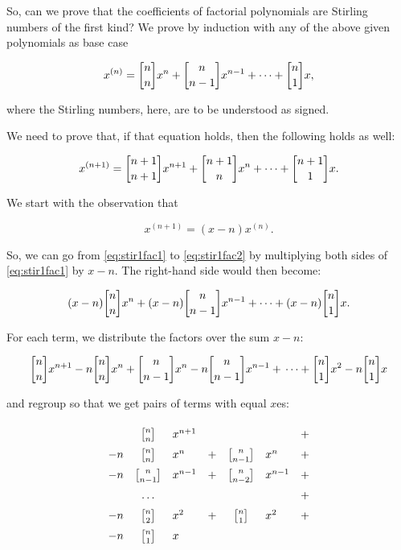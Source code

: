 \documentclass[tikz]{scrreprt}
\begin{document}
So, can we prove that the coefficients of factorial polynomials
are Stirling numbers of the first kind?
We prove by induction with any of the above given polynomials
as base case

\begin{equation}\label{eq:stir1fac1}
x^{(n)} = \stirlingOne{n}{n}x^n + 
          \stirlingOne{n}{n-1}x^{n-1} + \dots + 
          \stirlingOne{n}{1}x,
\end{equation}

where the Stirling numbers, here, are to be understood as signed.

We need to prove that, if that equation holds, 
then the following holds as well:

\begin{equation}\label{eq:stir1fac2}
x^{(n+1)} = \stirlingOne{n+1}{n+1}x^{n+1} + 
            \stirlingOne{n+1}{n}x^{n} + \dots + 
            \stirlingOne{n+1}{1}x.
\end{equation}

We start with the observation that

\begin{equation}
x^{(n+1)} = (x-n)x^{(n)}.
\end{equation}

So, we can go from \ref{eq:stir1fac1} to \ref{eq:stir1fac2}
by multiplying both sides of \ref{eq:stir1fac1} by $x-n$.
The right-hand side would then become:

\[
(x-n)\stirlingOne{n}{n}x^n + 
(x-n)\stirlingOne{n}{n-1}x^{n-1} +
      \dots + 
(x-n)\stirlingOne{n}{1}x.
\]

For each term, we distribute the factors over the sum $x-n$:

\[
\stirlingOne{n}{n}x^{n+1} - n\stirlingOne{n}{n}x^n        + \\
\stirlingOne{n}{n-1}x^n   - n\stirlingOne{n}{n-1}x^{n-1}  + \\
\dots                                                     + \\
\stirlingOne{n}{1}x^2     - n\stirlingOne{n}{1}x         
\]

and regroup so that we get pairs of terms 
with equal $x$es:

\[
\begingroup
\renewcommand{\arraystretch}{1.5}
\begin{array}{lclcclc}
  &\stirlingOne{n}{n}  &x^{n+1}& &                    &       & + \\
-n&\stirlingOne{n}{n}  &x^n    &+&\stirlingOne{n}{n-1}&x^n    & + \\
-n&\stirlingOne{n}{n-1}&x^{n-1}&+&\stirlingOne{n}{n-2}&x^{n-1}& + \\
  & \dots              &       & &                    &       & + \\
-n&\stirlingOne{n}{2}  &x^{2}  &+&\stirlingOne{n}{1}  &x^{2}  & + \\
-n&\stirlingOne{n}{1}  &x      & &                    &       & 
\end{array}
\endgroup
\]
\end{document}
